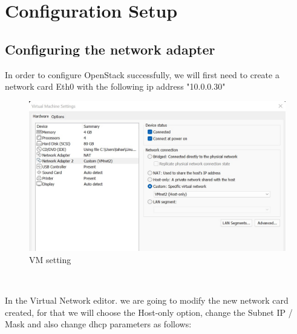 \chapter{Configuration Setup}
\begin{spacing}{1.2}
\section{Configuring the network adapter }

\par In order to configure OpenStack successfully, we will first need to create a network card
Eth0 with the following ip address "10.0.0.30"
\\
\begin{figure}[!htb] 
\begin{center} 
\includegraphics[width=1\linewidth]{Cloud/Config/VM setting} 
\end{center} 
\caption{VM setting} 
\end{figure}  \FloatBarrier
\\
\par In the Virtual Network editor. we are going to modify the new network card created,
for that we will choose the Host-only option, change the Subnet IP / Mask and also change
dhcp parameters as follows: 
\\
\begin{figure}[!htb] 
\begin{center} 

\end{center}
\end{figure}
\end{spacing}
